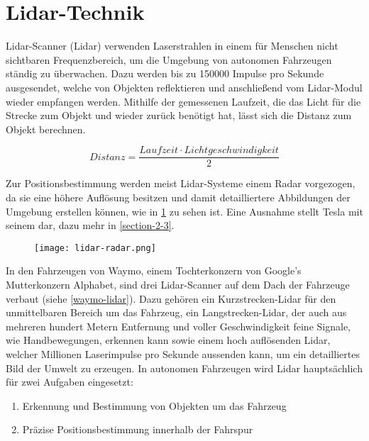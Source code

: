 \section{Lidar-Technik}

\acs{Lidar}-Scanner (\acl{Lidar}) verwenden Laserstrahlen in einem für Menschen nicht sichtbaren Frequenzbereich, um die Umgebung von autonomen Fahrzeugen ständig zu überwachen. Dazu werden bis zu \num{150000} Impulse pro Sekunde ausgesendet, welche von Objekten reflektieren und anschließend vom \acs{Lidar}-Modul wieder empfangen werden.  Mithilfe der gemessenen Laufzeit, die das Licht für die Strecke zum Objekt und wieder zurück benötigt hat, lässt sich die Distanz zum Objekt berechnen.

\begin{equation}
  Distanz = \frac{Laufzeit \cdot Lichtgeschwindigkeit}{2}
\end{equation}
\vspace{0.3cm}

Zur Positionsbestimmung werden meist \acs{Lidar}-Systeme einem \acs{Radar} vorgezogen, da sie eine höhere Auflösung besitzen und damit detailliertere Abbildungen der Umgebung erstellen können, wie in \ref{lidar-radar} zu sehen ist. Eine Ausnahme stellt Tesla mit seinem  dar, dazu mehr in \ref{section-2-3}.

\begin{figure}\centering
  \texttt{[image: lidar-radar.png]}
  \label{lidar-radar}
\end{figure}

In den Fahrzeugen von Waymo, einem Tochterkonzern von Google's Mutterkonzern Alphabet, sind drei \acs{Lidar}-Scanner auf dem Dach der Fahrzeuge verbaut (siehe \ref{waymo-lidar}). Dazu gehören ein Kurzstrecken-\acs{Lidar} für den unmittelbaren Bereich um das Fahrzeug, ein Langstrecken-\acs{Lidar}, der auch aus mehreren hundert Metern Entfernung und voller Geschwindigkeit feine Signale, wie Handbewegungen, erkennen kann sowie einem hoch auflösenden \acs{Lidar}, welcher Millionen Laserimpulse pro Sekunde aussenden kann, um ein detailliertes Bild der Umwelt zu erzeugen.  In autonomen Fahrzeugen wird \acs{Lidar} hauptsächlich für zwei Aufgaben eingesetzt:
\begin{enumerate}
  \item{Erkennung und Bestimmung von Objekten um das Fahrzeug}
  \item{Präzise Positionsbestimmung innerhalb der Fahrspur}
\end{enumerate}

